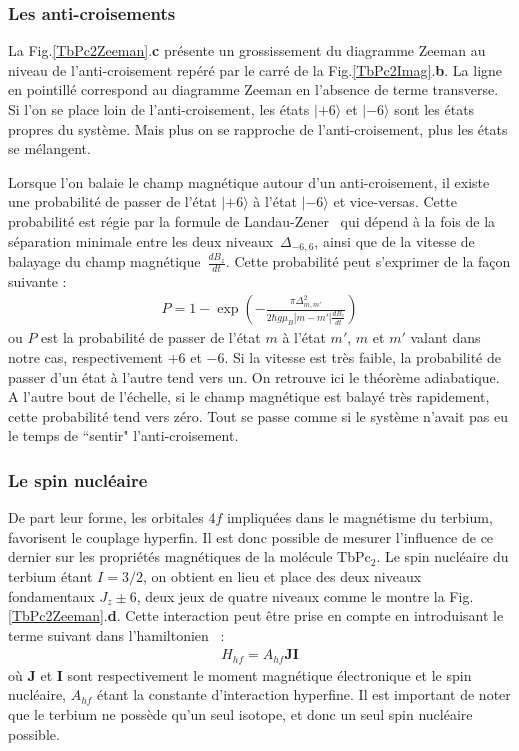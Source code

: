 \subsubsection{Les anti-croisements}
La Fig.\ref{TbPc2Zeeman}.\textbf{c} présente un grossissement du diagramme Zeeman au niveau de l'anti-croisement repéré par le carré de la Fig.\ref{TbPc2Imag}.\textbf{b}. La ligne en pointillé correspond au diagramme Zeeman en l'absence de terme transverse. Si l'on se place loin de l'anti-croisement, les états $|+6\rangle$ et $|-6\rangle$ sont les états propres du système. Mais plus on se rapproche de l'anti-croisement, plus les états se mélangent.

Lorsque l'on balaie le champ magnétique autour d'un anti-croisement, il existe une probabilité de passer de l'état $|+6\rangle$ à l'état $|-6\rangle$ et vice-versas. Cette probabilité est régie par la formule de Landau-Zener~\cite{Zener1932} qui dépend à la fois de la séparation minimale entre les deux niveaux~$\Delta_{-6,6}$, ainsi que de la vitesse de balayage du champ magnétique~$\frac{dB_z}{dt}$. Cette probabilité peut s'exprimer de la façon suivante :
\begin{eqnarray}
P = 1 - \exp \left( -\frac{\pi \Delta^2_{m,m'}}{2 \hbar g \mu_B |m-m'|\frac{dB_z}{dt}} \right)
\end{eqnarray}
ou $P$ est la probabilité de passer de l'état $m$ à l'état $m'$, $m$ et $m'$ valant dans notre cas, respectivement $+6$ et $-6$. Si la vitesse est très faible, la probabilité de passer d'un état à l'autre tend vers un. On retrouve ici le théorème adiabatique. A l'autre bout de l'échelle, si le champ magnétique est balayé très rapidement, cette probabilité tend vers zéro. Tout se passe comme si le système n'avait pas eu le temps de ``sentir" l'anti-croisement.




\subsubsection{Le spin nucléaire}
De part leur forme, les orbitales $4f$ impliquées dans le magnétisme du terbium, favorisent le couplage hyperfin. Il est donc possible de mesurer l'influence de ce dernier sur les propriétés magnétiques de la molécule TbPc$_{2}$. Le spin nucléaire du terbium étant $I = 3/2$, on obtient en lieu et place des deux niveaux fondamentaux $J_z \pm 6$, deux jeux de quatre niveaux comme le montre la Fig.\ref{TbPc2Zeeman}.\textbf{d}. Cette interaction peut être prise en compte en introduisant le terme suivant dans l'hamiltonien~\cite{Bleaney1961} :
\begin{eqnarray}
H_{hf} = A_{hf}\mathbf{J}\mathbf{I}
\end{eqnarray}
où $\mathbf{J}$ et $\mathbf{I}$ sont respectivement le moment magnétique électronique et le spin nucléaire, $A_{hf}$ étant la constante d'interaction hyperfine. Il est important de noter que le terbium ne possède qu'un seul isotope, et donc un seul spin nucléaire possible.

